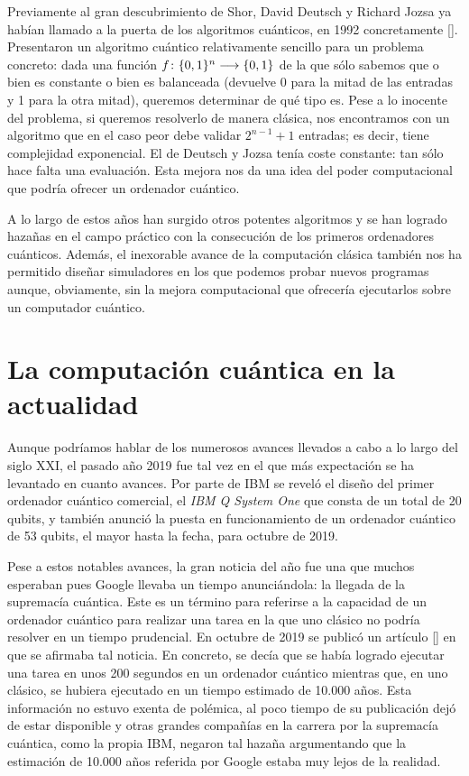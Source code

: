 Previamente al gran descubrimiento de Shor, David Deutsch y Richard Jozsa ya habían llamado a la puerta de los algoritmos cuánticos, en 1992 concretamente [\cite{deutsch1992rapid}]. Presentaron un algoritmo cuántico relativamente sencillo para un problema concreto: dada una función $f\colon \{0,1\}^n\longrightarrow \{0,1\}$ de la que sólo sabemos que o bien es constante o bien es balanceada (devuelve 0 para la mitad de las entradas y 1 para la otra mitad), queremos determinar de qué tipo es. Pese a lo inocente del problema, si queremos resolverlo de manera clásica, nos encontramos con un algoritmo que en el caso peor debe validar  $2^{n-1}+1$ entradas; es decir, tiene complejidad exponencial. El de Deutsch y Jozsa tenía coste constante: tan sólo hace falta una evaluación. Esta mejora nos da una idea del poder computacional que podría ofrecer un ordenador cuántico.

A lo largo de estos años han surgido otros potentes algoritmos y se han logrado hazañas en el campo práctico con la consecución de los primeros ordenadores cuánticos. Además, el inexorable avance de la computación clásica también nos ha permitido diseñar simuladores en los que podemos probar nuevos programas aunque, obviamente, sin la mejora computacional que ofrecería ejecutarlos sobre un computador cuántico.

\section{La computación cuántica en la actualidad}
Aunque podríamos hablar de los numerosos avances llevados a cabo a lo largo del siglo XXI, el pasado año 2019 fue tal vez en el que más expectación se ha levantado en cuanto avances. Por parte de IBM se reveló el diseño del primer ordenador cuántico comercial, el \textit{IBM Q System One} que consta de un total de 20 qubits, y también anunció la puesta en funcionamiento de un ordenador cuántico de 53 qubits, el mayor hasta la fecha, para octubre de 2019.

Pese a estos notables avances, la gran noticia del año fue una que muchos esperaban pues Google llevaba un tiempo anunciándola: la llegada de la supremacía cuántica. Este es un término para referirse a la capacidad de un ordenador cuántico para realizar una tarea en la que uno clásico no podría resolver en un tiempo prudencial. En octubre de 2019 se publicó un artículo [\cite{arute2019quantum}] en que se afirmaba tal noticia. En concreto, se decía que se había logrado ejecutar una tarea en unos 200 segundos en un ordenador cuántico mientras que, en uno clásico, se hubiera ejecutado en un tiempo estimado de 10.000 años. Esta información no estuvo exenta de polémica, al poco tiempo de su publicación dejó de estar disponible y otras grandes compañías en la carrera por la supremacía cuántica, como la propia IBM, negaron tal hazaña argumentando que la estimación de 10.000 años referida por Google estaba muy lejos de la realidad.

